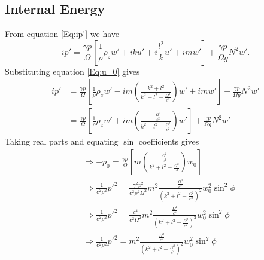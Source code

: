 \documentclass[12pt]{article}
\begin{document}
\subsection{Internal Energy}
From equation \ref{Eq:ip'} we have 
\begin{equation}
ip' = \frac{\gamma p}{\Omega} \left[ \frac{1}{\rho} \rho_z w' + iku' + i\frac{l^2}{k}u' + im w' \right] + \frac{\gamma p}{\Omega g} N^2 w'.
\end{equation}
Substituting equation \ref{Eq:u_0} gives
\begin{align}
ip' & = \frac{\gamma p}{\Omega} \left[ \frac{1}{\rho} \rho_z w' - im\left(  \frac{k^2 + l^2}{k^2 + l^2 - \frac{ \Omega ^2}{c^2} }\right)w' + im w' \right] + \frac{\gamma p}{\Omega g} N^2 w' \\ 
&= \frac{\gamma p}{\Omega} \left[ \frac{1}{\rho} \rho_z w' + im\left(  \frac{-\frac{\Omega^2}{c^2}}{k^2 + l^2 - \frac{ \Omega ^2}{c^2} }\right) w' \right] + \frac{\gamma p}{\Omega g} N^2 w'
\end{align}
Taking real parts and equating $\sin$ coefficients gives
\begin{align}
& \Rightarrow -p_0 = \frac{\gamma p}{\Omega} \left[m\left(  \frac{\frac{\Omega^2}{c^2}}{k^2 + l^2 - \frac{ \Omega ^2}{c^2} }\right) w_0 \right] \\
& \Rightarrow \frac{1}{c^2 \rho^2} p'^2 = \frac{\gamma^2 p^2}{c^2 \rho^2 \Omega^2} m^2 \frac{\frac{\Omega^4}{c^4}}{\left(k^2 + l^2 - \frac{ \Omega ^2}{c^2}\right)^2 } w_0^2 \sin^2\phi \\
& \Rightarrow \frac{1}{c^2 \rho^2} p'^2 = \frac{c^4}{c^2 \Omega^2} m^2 \frac{\frac{\Omega^4}{c^4}}{\left(k^2 + l^2 - \frac{ \Omega ^2}{c^2}\right)^2 } w_0^2 \sin^2\phi \\
& \Rightarrow \frac{1}{c^2 \rho^2} p'^2 =  m^2 \frac{\frac{\Omega^2}{c^2}}{\left(k^2 + l^2 - \frac{ \Omega ^2}{c^2}\right)^2 } w_0^2 \sin^2\phi   
\end{align}

\end{document}
